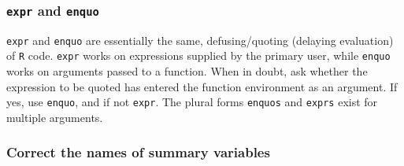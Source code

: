 \documentclass[]{book}
\newenvironment{Shaded}{}{}
\newcommand{\CommentTok}[1]{\textcolor[rgb]{0.38,0.63,0.69}{\textit{#1}}}
\newcommand{\DataTypeTok}[1]{\textcolor[rgb]{0.56,0.13,0.00}{#1}}
\newcommand{\KeywordTok}[1]{\textcolor[rgb]{0.00,0.44,0.13}{\textbf{#1}}}
\newcommand{\NormalTok}[1]{#1}
\newcommand{\OperatorTok}[1]{\textcolor[rgb]{0.40,0.40,0.40}{#1}}
\newcommand{\StringTok}[1]{\textcolor[rgb]{0.25,0.44,0.63}{#1}}
\begin{document}
\begin{Shaded}
\end{Shaded}

\hypertarget{expr-and-enquo}{%
\subsubsection*{\texorpdfstring{\texttt{expr} and \texttt{enquo}}{expr and enquo}}\label{expr-and-enquo}}

\texttt{expr} and \texttt{enquo} are essentially the same, defusing/quoting (delaying evaluation) of \texttt{R} code. \texttt{expr} works on expressions supplied by the primary user, while \texttt{enquo} works on arguments passed to a function. When in doubt, ask whether the expression to be quoted has entered the function environment as an argument. If yes, use \texttt{enquo}, and if not \texttt{expr}. The plural forms \texttt{enquos} and \texttt{exprs} exist for multiple arguments.

\hypertarget{correct-the-names-of-summary-variables}{%
\subsubsection{Correct the names of summary variables}\label{correct-the-names-of-summary-variables}}
\end{document}
